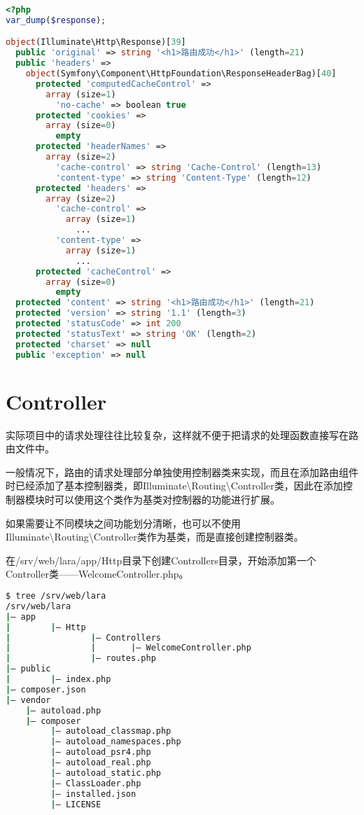 \begin{lstlisting}[language=PHP]
<?php
var_dump($response);

object(Illuminate\Http\Response)[39]
  public 'original' => string '<h1>路由成功</h1>' (length=21)
  public 'headers' => 
    object(Symfony\Component\HttpFoundation\ResponseHeaderBag)[40]
      protected 'computedCacheControl' => 
        array (size=1)
          'no-cache' => boolean true
      protected 'cookies' => 
        array (size=0)
          empty
      protected 'headerNames' => 
        array (size=2)
          'cache-control' => string 'Cache-Control' (length=13)
          'content-type' => string 'Content-Type' (length=12)
      protected 'headers' => 
        array (size=2)
          'cache-control' => 
            array (size=1)
              ...
          'content-type' => 
            array (size=1)
              ...
      protected 'cacheControl' => 
        array (size=0)
          empty
  protected 'content' => string '<h1>路由成功</h1>' (length=21)
  protected 'version' => string '1.1' (length=3)
  protected 'statusCode' => int 200
  protected 'statusText' => string 'OK' (length=2)
  protected 'charset' => null
  public 'exception' => null
\end{lstlisting}



\section{Controller}

实际项目中的请求处理往往比较复杂，这样就不便于把请求的处理函数直接写在路由文件中。

一般情况下，路由的请求处理部分单独使用控制器类来实现，而且在添加路由组件时已经添加了基本控制器类，即Illuminate\textbackslash Routing\textbackslash Controller类，因此在添加控制器模块时可以使用这个类作为基类对控制器的功能进行扩展。

如果需要让不同模块之间功能划分清晰，也可以不使用Illuminate\textbackslash Routing\textbackslash Controller类作为基类，而是直接创建控制器类。

在/srv/web/lara/app/Http目录下创建Controllers目录，开始添加第一个Controller类——WelcomeController.php。

\begin{lstlisting}[language=bash]
$ tree /srv/web/lara
/srv/web/lara
|— app
|        |— Http
|                |— Controllers
|                |       |— WelcomeController.php 
|                |— routes.php
|— public
|        |— index.php
|— composer.json
|— vendor
    |— autoload.php
    |— composer
         |— autoload_classmap.php
         |— autoload_namespaces.php
         |— autoload_psr4.php
         |— autoload_real.php
         |— autoload_static.php
         |— ClassLoader.php
         |— installed.json
         |— LICENSE
\end{lstlisting}

